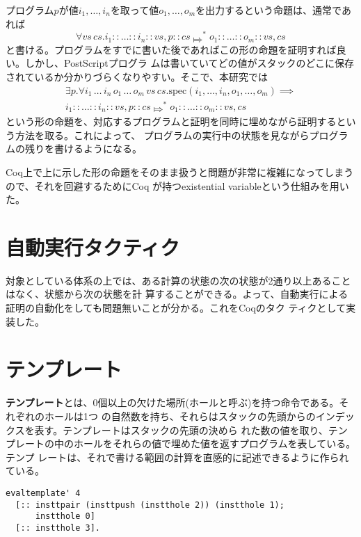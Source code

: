 \documentclass[a4paper, 10.5pt, twocolumn]{ujarticle}
\begin{document}
プログラム$p$が値$i_1, \dots, i_n$を取って値$o_1, \dots, o_m$を出力するという命題は、通常であれば
\[
 \forall \mathit{vs} \, \mathit{cs}.
 i_1 :: \ldots :: i_n :: vs, p :: cs \Mapsto^* o_1 :: \ldots :: o_m :: vs, cs
\]
と書ける。プログラムをすでに書いた後であればこの形の命題を証明すれば良い。しかし、PostScriptプログラ
ムは書いていてどの値がスタックのどこに保存されているか分かりづらくなりやすい。そこで、本研究では
\begin{align*}
 \exists p. \forall i_1 \, \dots \, i_n \, o_1 \, \dots \, o_m \, \mathit{vs} \, \mathit{cs}.
 \mathrm{spec}(i_1, \dots, i_n, o_1, \dots, o_m) \implies \\
 i_1 :: \ldots :: i_n :: vs, p :: cs \Mapsto^* o_1 :: \ldots :: o_m :: vs, cs
\end{align*}
という形の命題を、対応するプログラムと証明を同時に埋めながら証明するという方法を取る。これによって、
プログラムの実行中の状態を見ながらプログラムの残りを書けるようになる。

Coq上で上に示した形の命題をそのまま扱うと問題が非常に複雑になってしまうので、それを回避するためにCoq
が持つexistential variableという仕組みを用いた。

\section*{自動実行タクティク}

対象としている体系の上では、ある計算の状態の次の状態が2通り以上あることはなく、状態から次の状態を計
算することができる。よって、自動実行による証明の自動化をしても問題無いことが分かる。これをCoqのタク
ティクとして実装した。

\section*{テンプレート}

\textbf{テンプレート}とは、0個以上の欠けた場所(ホールと呼ぶ)を持つ命令である。それぞれのホールは1つ
の自然数を持ち、それらはスタックの先頭からのインデックスを表す。テンプレートはスタックの先頭の決めら
れた数の値を取り、テンプレートの中のホールをそれらの値で埋めた値を返すプログラムを表している。テンプ
レートは、それで書ける範囲の計算を直感的に記述できるように作られている。

\begin{lstlisting}[style=plain, label=listing:template_example, caption=テンプレートの記述の例]
evaltemplate' 4
  [:: insttpair (insttpush (instthole 2)) (instthole 1);
      instthole 0]
  [:: instthole 3].
\end{lstlisting}
\end{document}
